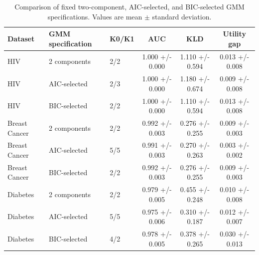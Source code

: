 \begin{table}
\caption{Comparison of fixed two-component, AIC-selected, and BIC-selected GMM specifications. Values are mean $\pm$ standard deviation.}
\label{tab:gmm_component_sensitivity}
\begin{tabular}{lllccc}
\toprule
Dataset & GMM specification & K0/K1 & AUC & KLD & Utility gap \\
\midrule
HIV & 2 components & 2/2 & 1.000 +/- 0.000 & 1.110 +/- 0.594 & 0.013 +/- 0.008 \\
HIV & AIC-selected & 2/3 & 1.000 +/- 0.000 & 1.180 +/- 0.674 & 0.009 +/- 0.008 \\
HIV & BIC-selected & 2/2 & 1.000 +/- 0.000 & 1.110 +/- 0.594 & 0.013 +/- 0.008 \\
Breast Cancer & 2 components & 2/2 & 0.992 +/- 0.003 & 0.276 +/- 0.255 & 0.009 +/- 0.003 \\
Breast Cancer & AIC-selected & 5/5 & 0.991 +/- 0.003 & 0.270 +/- 0.263 & 0.003 +/- 0.002 \\
Breast Cancer & BIC-selected & 2/2 & 0.992 +/- 0.003 & 0.276 +/- 0.255 & 0.009 +/- 0.003 \\
Diabetes & 2 components & 2/2 & 0.979 +/- 0.005 & 0.455 +/- 0.248 & 0.010 +/- 0.008 \\
Diabetes & AIC-selected & 5/5 & 0.975 +/- 0.006 & 0.310 +/- 0.187 & 0.012 +/- 0.007 \\
Diabetes & BIC-selected & 4/2 & 0.978 +/- 0.005 & 0.378 +/- 0.265 & 0.030 +/- 0.013 \\
\bottomrule
\end{tabular}
\end{table}
